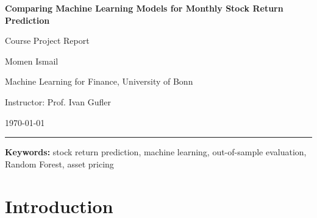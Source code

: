 \documentclass[11pt,a4paper]{article}
\newcommand{\papertitle}{Comparing Machine Learning Models for Monthly Stock Return Prediction}
\begin{document}
\begin{center}
  {\LARGE\bfseries \papertitle\par}
  \vspace{0.35em}
  {\large Course Project Report\par}
  \vspace{0.65em}
  {\large Momen Ismail\par}
  \vspace{0.2em}
  {Machine Learning for Finance, University of Bonn\par}
  {Instructor: Prof. Ivan Gufler\par}  \vspace{0.3em}
  {\today\par}
\end{center}

\vspace{0.55em}
\hrule
\vspace{0.75em}

\begin{abstract}
This project compares six models for predicting next-month stock excess
returns: a historical mean benchmark, OLS-3, Partial Least Squares, Elastic
Net, Random Forest, and Gradient Boosting. I use a monthly panel with 211,059
stock-month observations, 656 tickers, and 484 predictors from February 1990
to December 2025. The model choices are made using chronological training and
validation periods, and the final specifications are evaluated once on the
2020--2025 test sample. Random Forest performs best and reduces monthly squared
forecast error by about 1.14\% relative to the historical mean. OLS-3 provides
a very small improvement, Elastic Net reduces all coefficients to zero, and
PLS and Gradient Boosting perform worse than the benchmark. The main conclusion
is that machine learning can provide a modest improvement, but the result is
not stable across years and does not by itself imply a profitable trading
strategy.
\end{abstract}

\noindent\textbf{Keywords:} stock return prediction, machine learning,
out-of-sample evaluation, Random Forest, asset pricing

\section{Introduction}
\label{sec:introduction}
\end{document}
